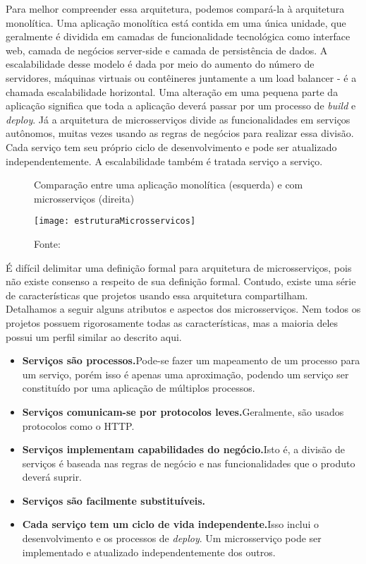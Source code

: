 Para melhor compreender essa arquitetura, podemos compará-la à arquitetura monolítica. Uma aplicação monolítica está contida em uma única unidade, que geralmente é dividida em camadas de funcionalidade tecnológica como interface web, camada de negócios server-side e camada de persistência de dados. A escalabilidade desse modelo é dada por meio do aumento do número de servidores, máquinas virtuais ou contêineres juntamente a um load balancer - é a chamada escalabilidade horizontal. Uma alteração em uma pequena parte da aplicação significa que toda a aplicação deverá passar por um processo de \textit{build} e \textit{deploy}. Já a arquitetura de microsserviços divide as funcionalidades em serviços autônomos, muitas vezes usando as regras de negócios para realizar essa divisão. Cada serviço tem seu próprio ciclo de desenvolvimento e pode ser atualizado independentemente. A escalabilidade também é tratada serviço a serviço.

\begin{figure}[H]
	\centering
	\caption{Comparação entre uma aplicação monolítica (esquerda) e com microsserviços (direita)}
  \texttt{[image: estruturaMicrosservicos]}
	\caption*{Fonte: \cite{lewis}}
\label{fig:estruturaMicrosservicos}
\end{figure}

É difícil delimitar uma definição formal para arquitetura de microsserviços, pois não existe consenso a respeito de sua definição formal. Contudo, existe uma série de características que projetos usando essa arquitetura compartilham. Detalhamos a seguir alguns atributos e aspectos dos microsserviços. Nem todos os projetos possuem rigorosamente todas as características, mas a maioria deles possui um perfil similar ao descrito aqui.

\begin{itemize}
\item \textbf{Serviços são processos.}Pode-se fazer um mapeamento de um processo para um serviço, porém isso é apenas uma aproximação, podendo um serviço ser constituído por uma aplicação de múltiplos processos.
\item \textbf{Serviços comunicam-se por protocolos leves.}Geralmente, são usados protocolos como o HTTP.
\item \textbf{Serviços implementam capabilidades do negócio.}Isto é, a divisão de serviços é baseada nas regras de negócio e nas funcionalidades que o produto deverá suprir.
\item \textbf{Serviços são facilmente substituíveis.}
\item \textbf{Cada serviço tem um ciclo de vida independente.}Isso inclui o desenvolvimento e os processos de \textit{deploy}. Um microsserviço pode ser implementado e atualizado independentemente dos outros.
\end{itemize}

